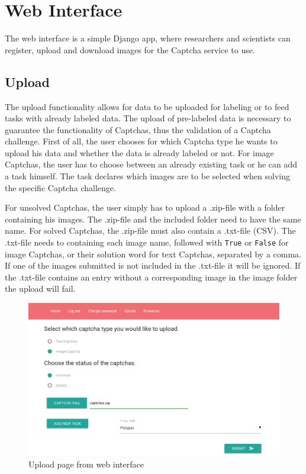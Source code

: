 \section{Web Interface}
\label{sec:web_interface}

The web interface is a simple Django app, where researchers and scientists can register, upload and download images for the Captcha service to use.

\subsection{Upload}

The upload functionality allows for data to be uploaded for labeling or to feed tasks with already labeled data. The upload of pre-labeled data is necessary to guarantee the functionality of Captchas, thus the validation of a Captcha challenge.
First of all, the user chooses for which Captcha type he wants to upload his data and whether the data is already labeled or not.
For image Captchas, the user has to choose between an already existing task or he can add a task himself. The task declares which images are to be selected when solving the specific Captcha challenge.

For unsolved Captchas, the user simply has to upload a .zip-file with a folder containing his images. The .zip-file and the included folder need to have the same name.
For solved Captchas, the .zip-file must also contain a .txt-file (CSV). The .txt-file needs to containing each image name, followed with \verb|True| or \verb|False| for image Captchas, or their solution word for text Captchas, separated by a comma. If one of the images submitted is not included in the .txt-file it will be ignored. If the .txt-file contains an entry without a corresponding image in the image folder the upload will fail. 
\begin{figure}[H]
\centering
\includegraphics[width=1\linewidth]{content/figures/upload.png}
\caption{Upload page from web interface}
\label{fig:upload}
\end{figure}

